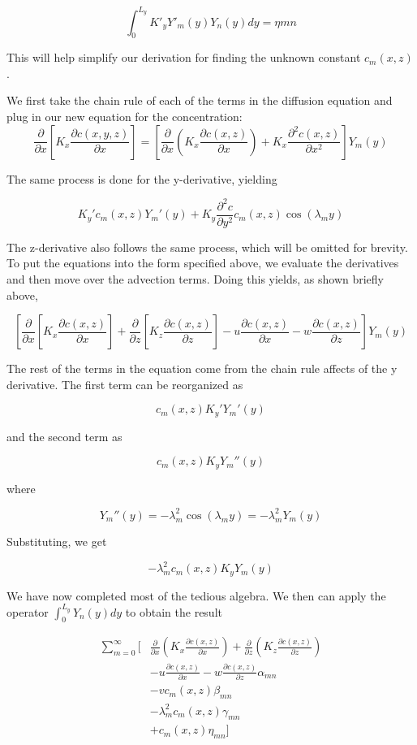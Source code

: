 \documentclass{article}
\begin{document}
$$
    \int_0^{L_y} K'_y Y'_m(y)Y_n(y) dy = \eta{mn}
$$

This will help simplify our derivation for finding the unknown constant $c_m(x, z)$.

We first take the chain rule of each of the terms in the diffusion equation and plug in our new equation for the concentration:
$$
    \frac{\partial}{\partial x} [K_x \frac{\partial c(x, y, z)}{\partial x}] = [\frac{\partial}{\partial x} (K_x \frac{\partial c(x, z)}{\partial x}) + K_x \frac{\partial^2 c(x, z)}{\partial x^2}]Y_m(y)
$$

The same process is done for the y-derivative, yielding

$$
    K_y' c_m(x, z) Y_m'(y) + K_y \frac{\partial^2 c}{\partial y^2} c_m(x, z) \cos(\lambda_m y)
$$

The z-derivative also follows the same process, which will be omitted for brevity. To put the equations into the form specified above, we evaluate 
the derivatives and then move over the advection terms. Doing this yields, as shown briefly above,

$$
    [\frac{\partial}{\partial x} [K_x \frac{\partial c(x, z)}{\partial x}] + \frac{\partial}{\partial z} [K_z \frac{\partial c(x, z)}{\partial z}] - u \frac{\partial c(x, z)}{\partial x} - w \frac{\partial c(x, z)}{\partial z}] Y_m(y)
$$

The rest of the terms in the equation come from the chain rule affects of the y derivative. The first term can be reorganized as

$$
    c_m(x, z) K_y' Y_m'(y)
$$

and the second term as 

$$
    c_m(x, z) K_y Y_m''(y)
$$

where 

$$
    Y_m''(y) = -\lambda_m^2 \cos(\lambda_m y) = -\lambda_m^2 Y_m(y)
$$

Substituting, we get 

$$
    -\lambda_m^2 c_m(x, z) K_y Y_m(y)
$$

We have now completed most of the tedious algebra. We then can apply the operator $\int_0^{L_y} Y_n(y) dy$ to obtain the result


\begin{equation}
\begin{aligned}
    \sum_{m=0}^{\infty} \Bigg[ &\frac{\partial}{\partial x} \left( K_x \frac{\partial c(x, z)}{\partial x} \right) + \frac{\partial}{\partial z} \left( K_z \frac{\partial c(x, z)}{\partial z} \right) \\
    &- u \frac{\partial c(x, z)}{\partial x} - w \frac{\partial c(x, z)}{\partial z}  \alpha_{mn} \\
    &- v c_m(x, z) \beta_{mn} \\
    &- \lambda_m^2 c_m(x, z) \gamma_{mn} \\
    &+ c_m(x, z) \eta_{mn} \Bigg]
\end{aligned}
\end{equation}
\end{document}
